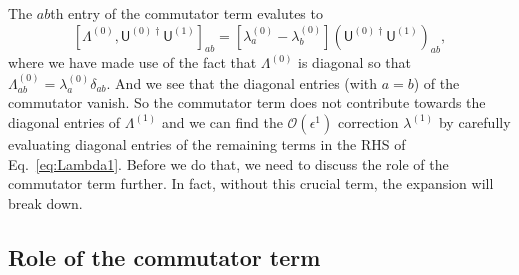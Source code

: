 The $ab$th entry of the commutator term evalutes to
%
\begin{equation}
    \left[\Lambda^{(0)},\mathsf{U}^{(0)\dagger}\mathsf{U}^{(1)}\right]_{ab} = %
    \left[\lambda^{(0)}_{a} - \lambda^{(0)}_{b}\right]\left(\mathsf{U}^{(0)\dagger}\mathsf{U}^{(1)}\right)_{ab},
    \label{eq:diagonal}
\end{equation}
%
where we have made use of the fact that $\Lambda^{(0)}$ is diagonal so that $\Lambda^{(0)}_{ab} = \lambda^{(0)}_{a}\delta_{ab}$.
And we see that the diagonal entries (with $a=b$) of the commutator vanish.
So the commutator term does not contribute towards the diagonal entries of $\Lambda^{(1)}$ and we can find the $\mathcal{O}(\epsilon^{1})$ correction $\lambda^{(1)}$ by carefully evaluating diagonal entries of the remaining terms in the RHS of Eq.~\eqref{eq:Lambda1}.
Before we do that, we need to discuss the role of the commutator term further.
In fact, without this crucial term, the expansion will break down.

\subsection{Role of the commutator term}

